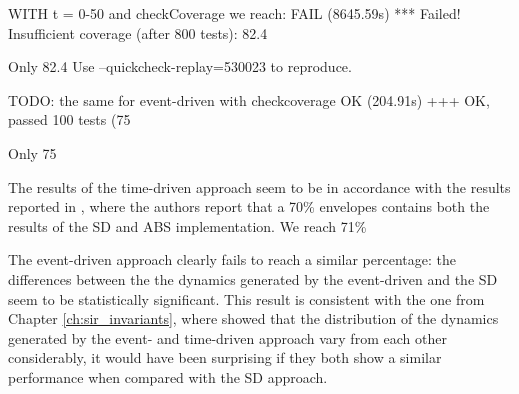 WITH t = 0-50 and checkCoverage we reach:
FAIL (8645.59s)
    *** Failed! Insufficient coverage (after 800 tests):
    82.4%
    
    Only 82.4%
    Use --quickcheck-replay=530023 to reproduce.
    
TODO: the same for event-driven with checkcoverage
OK (204.91s)
    +++ OK, passed 100 tests (75%
    
    Only 75%

%
%

The results of the time-driven approach seem to be in accordance with the results reported in \cite{macal_agent-based_2010}, where the authors report that a 70\% envelopes contains both the results of the SD and ABS implementation. We reach 71\% 

The event-driven approach clearly fails to reach a similar percentage: the differences between the the dynamics generated by the event-driven and the SD seem to be statistically significant. This result is consistent with the one from Chapter \ref{ch:sir_invariants}, where showed that the distribution of the dynamics generated by the event- and time-driven approach vary from each other considerably, it would have been surprising if they both show a similar performance when compared with the SD approach. 

